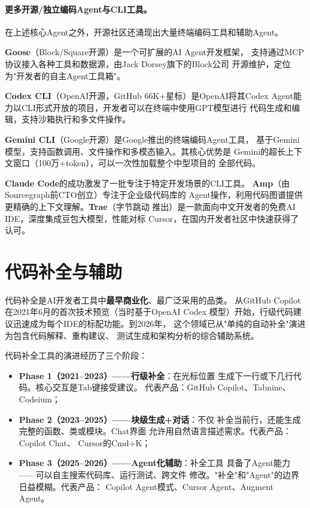 \paragraph{更多开源/独立编码Agent与CLI工具。}
在上述核心Agent之外，开源社区还涌现出大量终端编码工具和辅助Agent。

\textbf{Goose}（Block/Square开源）是一个可扩展的AI Agent开发框架，
支持通过MCP协议接入各种工具和数据源，由Jack Dorsey旗下的Block公司
开源维护，定位为"开发者的自主Agent工具箱"。

\textbf{Codex CLI}（OpenAI开源，GitHub 66K+星标）是OpenAI将其Codex
Agent能力以CLI形式开放的项目，开发者可以在终端中使用GPT模型进行
代码生成和编辑，支持沙箱执行和多文件操作。

\textbf{Gemini CLI}（Google开源）是Google推出的终端编码Agent工具，
基于Gemini模型，支持函数调用、文件操作和多模态输入。其核心优势是
Gemini的超长上下文窗口（100万+token），可以一次性加载整个中型项目的
全部代码。

\textbf{Claude Code}的成功激发了一批专注于特定开发场景的CLI工具。
\textbf{Amp}（由Sourcegraph前CTO创立）专注于企业级代码库的
Agent操作，利用代码图谱提供更精确的上下文理解。\textbf{Trae}（字节跳动
推出）是一款面向中文开发者的免费AI IDE，深度集成豆包大模型，性能对标
Cursor，在国内开发者社区中快速获得了认可。


\section{代码补全与辅助}
\label{sec:devtools-completion}

代码补全是AI开发者工具中\textbf{最早商业化}、最广泛采用的品类。
从GitHub Copilot在2021年6月的首次技术预览（当时基于OpenAI Codex
模型）开始，行级代码建议迅速成为每个IDE的标配功能。到2026年，
这个领域已从"单纯的自动补全"演进为包含代码解释、重构建议、
测试生成和架构分析的综合辅助系统。

代码补全工具的演进经历了三个阶段：
\begin{itemize}
  \item \textbf{Phase 1（2021--2023）——行级补全}：在光标位置
    生成下一行或下几行代码。核心交互是Tab键接受建议。
    代表产品：GitHub Copilot、Tabnine、Codeium；
  \item \textbf{Phase 2（2023--2025）——块级生成+对话}：不仅
    补全当前行，还能生成完整的函数、类或模块。Chat界面
    允许用自然语言描述需求。代表产品：Copilot Chat、
    Cursor的Cmd+K；
  \item \textbf{Phase 3（2025--2026）——Agent化辅助}：补全工具
    具备了Agent能力——可以自主搜索代码库、运行测试、跨文件
    修改。"补全"和"Agent"的边界日益模糊。代表产品：
    Copilot Agent模式、Cursor Agent、Augment Agent。
\end{itemize}

